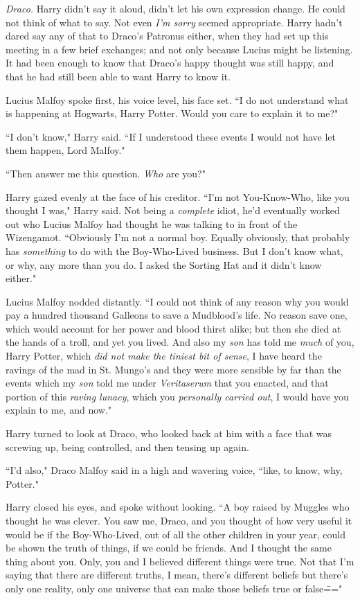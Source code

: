 \emph{Draco.} Harry didn't say it aloud, didn't let his own expression change. He could not think of what to say. Not even \emph{I'm sorry} seemed appropriate. Harry hadn't dared say any of that to Draco's Patronus either, when they had set up this meeting in a few brief exchanges; and not only because Lucius might be listening. It had been enough to know that Draco's happy thought was still happy, and that he had still been able to want Harry to know it.

Lucius Malfoy spoke first, his voice level, his face set. ``I do not understand what is happening at Hogwarts, Harry Potter. Would you care to explain it to me?"

``I don't know," Harry said. ``If I understood these events I would not have let them happen, Lord Malfoy."

``Then answer me this question. \emph{Who} are you?"

Harry gazed evenly at the face of his creditor. ``I'm not You-Know-Who, like you thought I was," Harry said. Not being a \emph{complete} idiot, he'd eventually worked out who Lucius Malfoy had thought he was talking to in front of the Wizengamot. ``Obviously I'm not a normal boy. Equally obviously, that probably has \emph{something} to do with the Boy-Who-Lived business. But I don't know what, or why, any more than you do. I asked the Sorting Hat and it didn't know either."

Lucius Malfoy nodded distantly. ``I could not think of any reason why you would pay a hundred thousand Galleons to save a Mudblood's life. No reason save one, which would account for her power and blood thirst alike; but then she died at the hands of a troll, and yet you lived. And also my \emph{son} has told me \emph{much} of you, Harry Potter, which \emph{did not make the tiniest bit of sense}, I have heard the ravings of the mad in St. Mungo's and they were more sensible by far than the events which my \emph{son} told me under \emph{Veritaserum} that you enacted, and that portion of this \emph{raving lunacy}, which you \emph{personally carried out}, I would have you explain to me, and now."

Harry turned to look at Draco, who looked back at him with a face that was screwing up, being controlled, and then tensing up again.

``I'd also," Draco Malfoy said in a high and wavering voice, ``like, to know, why, Potter."

Harry closed his eyes, and spoke without looking. ``A boy raised by Muggles who thought he was clever. You saw me, Draco, and you thought of how very useful it would be if the Boy-Who-Lived, out of all the other children in your year, could be shown the truth of things, if we could be friends. And I thought the same thing about you. Only, you and I believed different things were true. Not that I'm saying that there are different truths, I mean, there's different beliefs but there's only one reality, only one universe that can make those beliefs true or false\==="

